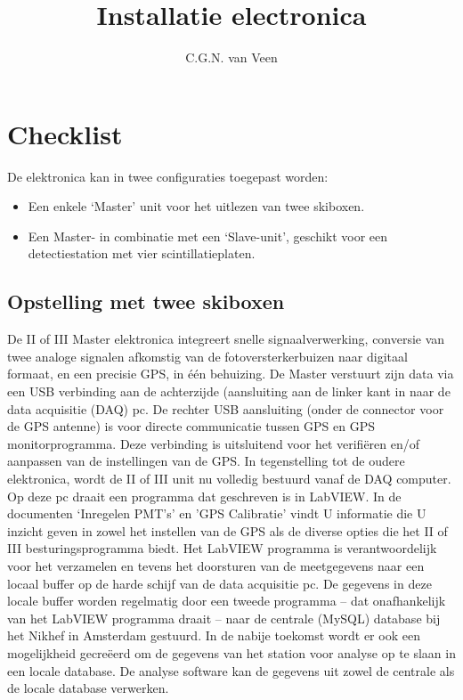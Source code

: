 

\title{Installatie \hisparc electronica}
\author{C.G.N. van Veen}



\maketitle

\section{Checklist}

De \hisparc elektronica kan in twee configuraties toegepast worden:
\begin{itemize}
    \item Een enkele ‘Master’ unit voor het uitlezen van twee skiboxen.
    \item Een Master- in combinatie met een ‘Slave-unit’, geschikt voor
    een detectiestation met vier scintillatieplaten.
\end{itemize}

\subsection{Opstelling met twee skiboxen}

De \hisparc II of III Master elektronica 
integreert snelle signaalverwerking, conversie van twee analoge signalen afkomstig van de
fotoversterkerbuizen naar digitaal formaat, en een precisie GPS, in één
behuizing. De Master verstuurt zijn data via een USB verbinding aan de
achterzijde (aansluiting aan de linker kant in 
naar de data acquisitie (DAQ) pc. De rechter USB aansluiting (onder de
connector voor de GPS antenne) is voor directe communicatie tussen GPS
en GPS monitorprogramma. Deze verbinding is uitsluitend voor het
verifiëren en/of aanpassen van de instellingen van de GPS. In
tegenstelling tot de oudere elektronica, wordt de \hisparc II of III unit
nu volledig bestuurd vanaf de DAQ computer. Op deze pc draait een
programma dat geschreven is in LabVIEW. In de documenten `Inregelen
PMT's' en 'GPS Calibratie'  vindt U informatie die U inzicht geven in
zowel het instellen van de GPS als de diverse opties die het \hisparc
II of III besturingsprogramma biedt. Het LabVIEW programma is
verantwoordelijk voor het verzamelen en tevens het doorsturen van de
meetgegevens naar een locaal buffer op de harde schijf van de data
acquisitie pc. De gegevens in deze locale buffer worden regelmatig door
een tweede programma – dat onafhankelijk van het LabVIEW programma
draait – naar de centrale (MySQL) database bij het Nikhef in Amsterdam
gestuurd. In de nabije toekomst wordt er ook een mogelijkheid gecreëerd
om de gegevens van het station voor analyse op te slaan in een locale
database. De analyse software kan de gegevens uit zowel de centrale als
de locale database verwerken.

